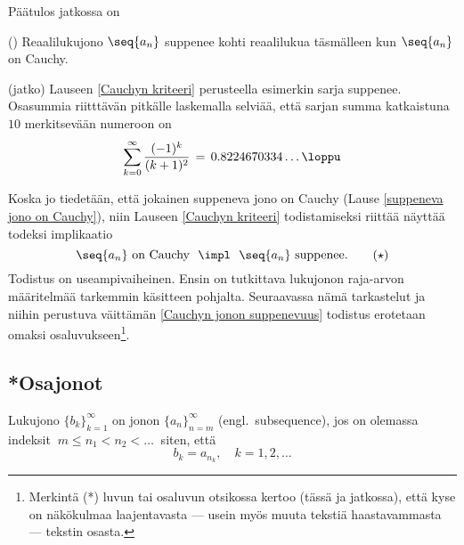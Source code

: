 Päätulos jatkossa on
\begin{*Lause} \label{Cauchyn kriteeri} 
 ()
Reaalilukujono $\seq{a_n}$ suppenee kohti reaalilukua täsmälleen kun $\seq{a_n}$ on Cauchy. 
\end{*Lause}
\jatko\jatko \begin{Exa} (jatko) Lauseen \ref{Cauchyn kriteeri} perusteella esimerkin
sarja suppenee. Osasummia riitttävän pitkälle laskemalla selviää, että sarjan summa katkaistuna
$10$ merkitsevään numeroon on
\[
\sum_{k=0}^\infty \frac{(-1)^k}{(k+1)^2} \,=\, 0.8224670334\ldots \loppu
\]
\end{Exa} \seur
Koska jo tiedetään, että jokainen suppeneva jono on Cauchy (Lause 
\ref{suppeneva jono on Cauchy}), niin Lauseen \ref{Cauchyn kriteeri} todistamiseksi riittää
näyttää todeksi implikaatio
\begin{equation} \label{Cauchyn jonon suppenevuus}
\seq{a_n}\ \text{on Cauchy}\ \ \impl\ \ \seq{a_n}\ \text{suppenee}. \tag{$\star$}
\end{equation}
Todistus on useampivaiheinen. Ensin on tutkittava lukujonon raja-arvon määritelmää
tarkemmin  käsitteen pohjalta. Seuraavassa nämä tarkastelut ja niihin perustuva
väittämän \eqref{Cauchyn jonon suppenevuus} todistus erotetaan omaksi 
osaluvukseen\footnote[2]{Merkintä (*) luvun tai osaluvun otsikossa kertoo 
(tässä ja jatkossa), että kyse on näkökulmaa laajentavasta --- usein myös muuta tekstiä 
haastavammasta --- tekstin osasta.}.

\subsection*{*Osajonot}

\begin{Def}   
Lukujono $\{b_k\}_{k=1}^{\infty}$ on jonon $\{a_n\}_{n=m}^{\infty}$ 
(engl.\ subsequence), jos on olemassa indeksit $\ m \le n_1 < n_2 < \ldots\ $ siten, että
\[
b_k = a_{n_k}, \quad k = 1,2, \ldots
\]  \end{Def}

